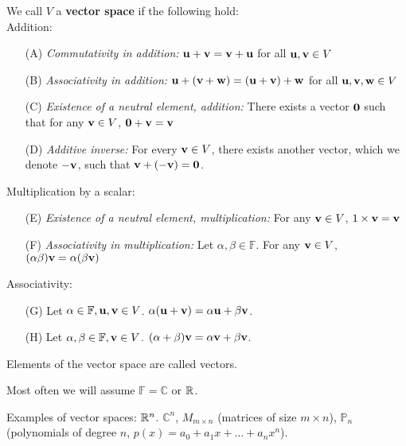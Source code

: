 \documentclass{article}
\begin{document}
\begin{definition}
\label{def:vec_space}
We call $V$ a \textbf{vector space} if the following hold: \\
Addition:
\begin{enumerate}
\setlength\itemsep{0.1em}
    \item[(A)] \textit{Commutativity in addition:} ${\mathbf{u}} + {\mathbf{v}} = {\mathbf{v}} + {\mathbf{u}}$ for all ${\mathbf{u}}, {\mathbf{v}} \in V$
    \item[(B)] \textit{Associativity in addition:} ${\mathbf{u}} + ({\mathbf{v}} + {\mathbf{w}}) = ({\mathbf{u}} + {\mathbf{v}}) + {\mathbf{w}}$ for all ${\mathbf{u}}, {\mathbf{v}}, {\mathbf{w}} \in V$
    \item[(C)] \textit{Existence of a neutral element, addition:} There exists a vector ${\mathbf{0}}$ such that for any ${\mathbf{v}} \in V$, ${\mathbf{0}} + {\mathbf{v}} = {\mathbf{v}}$
    \item[(D)] \textit{Additive inverse:} For every ${\mathbf{v}} \in V$, there exists another vector, which we denote $-{\mathbf{v}}$, such that ${\mathbf{v}} + (-{\mathbf{v}}) = {\mathbf{0}}$.
\end{enumerate}

Multiplication by a scalar:

\begin{enumerate}
\setlength\itemsep{0.1em}
    \item[(E)] \textit{Existence of a neutral element, multiplication:} For any ${\mathbf{v}} \in V$, $1\times {\mathbf{v}} = {\mathbf{v}}$
    \item[(F)] \textit{Associativity in multiplication:} Let $\alpha, \beta \in \mathbb{F}$. For any ${\mathbf{v}} \in V$, $(\alpha \beta) {\mathbf{v}} = \alpha (\beta {\mathbf{v}})$ 
\end{enumerate}

Associativity:
\begin{enumerate}
\setlength\itemsep{0.1em}
    \item[(G)] Let $\alpha \in \mathbb{F}, {\mathbf{u}}, {\mathbf{v}} \in V$. $\alpha ({\mathbf{u}} + {\mathbf{v}}) = \alpha {\mathbf{u}} + \beta {\mathbf{v}}$.
    \item[(H)] Let $\alpha, \beta \in \mathbb{F}, {\mathbf{v}} \in V$. $(\alpha + \beta) {\mathbf{v}} = \alpha {\mathbf{v}} + \beta {\mathbf{v}}$.
\end{enumerate}
\end{definition}

Elements of the vector space are called vectors.

Most often we will assume $\mathbb{F} = \mathbb{C}$ or ${\mathbb{R}}$.

Examples of vector spaces: ${\mathbb{R}}^n$. $\mathbb{C}^n$, $M_{m \times n}$ (matrices of size $m \times n$), $\mathbb{P}_n$ (polynomials of degree $n$, $p(x) = a_0 + a_1 x + \ldots + a_n x^n$).
\end{document}
